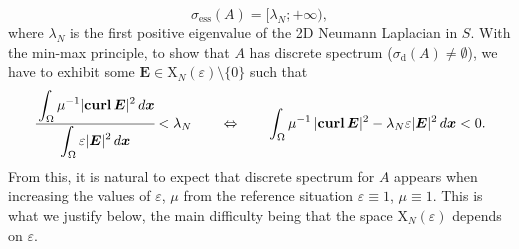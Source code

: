 \documentclass[11pt,a4paper]{article}
\newcommand{\dsp}{\displaystyle}
\newcommand{\eps}{\varepsilon}
\newcommand{\Om}{\Omega}
\newcommand{\mrm}[1]{\mathrm{#1}}
\newcommand{\bfx}{\boldsymbol{x}}
\newcommand{\mX}{\mrm{X}}
\newcommand{\curlvec}{\boldsymbol{\mrm{curl}}\,}
\def\E{\boldsymbol{E}}
\begin{document}
\[
\sigma_{\mrm{ess}}(A)=[\lambda_N;+\infty),
\]
where $\lambda_N$ is the first positive eigenvalue of the 2D Neumann Laplacian in $S$. With the min-max principle, to show that $A$ has discrete spectrum ($\sigma_{\mrm{d}}(A)\ne\emptyset$), we have to exhibit some $\E\in\boldsymbol{\mX}_N(\eps)\setminus\{0\}$ such that
\begin{equation}\label{MinMaxNonHomo}
\cfrac{\dsp\int_{\Om}\mu^{-1}|\curlvec\E|^2\,d\bfx}{\dsp\int_{\Om}\eps|\E|^2\,d\bfx}<\lambda_N\qquad\Leftrightarrow\qquad \dsp\int_{\Om}\mu^{-1}\,|\curlvec\E|^2-\lambda_N\eps|\E|^2\,d\bfx<0.
\end{equation}
From this, it is natural to expect that discrete spectrum for $A$ appears when increasing the values of $\eps$, $\mu$ from the reference situation $\eps\equiv1$, $\mu\equiv1$. This is what we justify below, the main difficulty being that the space $\boldsymbol{\mX}_N(\eps)$ depends on $\eps$.
\end{document}
